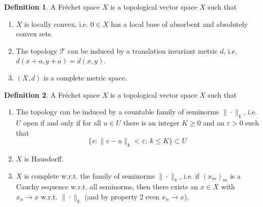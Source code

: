 \documentclass{scrartcl}
\theoremstyle{definition}
\newtheorem{definition}{Definition}
\theoremstyle{remark}
\newcommand{\Frechet}{Fr\'echet }
\newcommand{\T}{\mathcal T}
\newcommand{\eps}{\varepsilon}
\begin{document}
\begin{minipage}[t]{0.45\textwidth}
\begin{definition}\label{def:f1}
A \Frechet space $X$ is a topological vector space $X$ such that
\begin{enumerate}
\item $X$ is locally convex, i.e. $0\in X$ has a local base of absorbent and absolutely convex sets.
\item The topology $\T$ can be induced by a translation invariant metric $d$, i.e. $d(x+a, y+a) = d(x, y)$.
\item $(X, d)$ is a complete metric space.
\end{enumerate}
\end{definition}
\end{minipage}
\hfill
\begin{minipage}[t]{0.45\textwidth}
\begin{definition}\label{def:f2}
A \Frechet space $X$ is a topological vector space $X$ such that
\begin{enumerate}
\item The topology can be induced by a countable family of seminorms $\|\cdot \|_k$, i.e. $U$ open if and only if for all $u\in U$ there is an integer $K \geq 0$ and an $\eps > 0$ such that \[\{v: \|v-u\|_k<\eps:~ k\leq K\} \subset U\]
\item $X$ is Hausdorff.
\item $X$ is complete w.r.t. the family of seminorms $\|\cdot\|_k$, i.e. if $(x_m)_m$ is a Cauchy sequence w.r.t. all seminorms, then there exists an $x\in X$ with $x_n\to x$ w.r.t. $\|\cdot \|_k$ (and by property 2 even $x_n\to x$).
\end{enumerate}
\end{definition}
\end{minipage}
\end{document}
